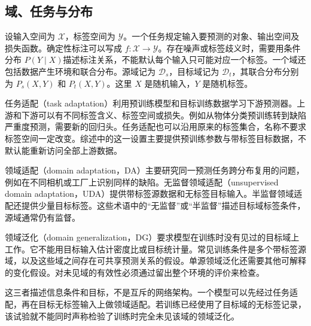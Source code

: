\subsection{域、任务与分布}
设输入空间为 $\mathcal X$，标签空间为 $\mathcal Y$。一个任务规定输入要预测的对象、输出空间及损失函数。确定性标注可以写成 $f:\mathcal X\to\mathcal Y$。存在噪声或标签歧义时，需要用条件分布 $P(Y\mid X)$描述标注关系，不能默认每个输入只可能对应一个标签。一个域还包括数据产生环境和联合分布。源域记为 $\mathcal D_s$，目标域记为 $\mathcal D_t$，其联合分布分别为 $P_s(X,Y)$ 和 $P_t(X,Y)$。这里 $X$ 是随机输入，$Y$ 是随机标签。

任务适配（task adaptation）利用预训练模型和目标训练数据学习下游预测器。上游和下游可以有不同标签含义、标签空间或损失。例如从物体分类预训练转到缺陷严重度预测，需要新的回归头。任务适配也可以沿用原来的标签集合，名称不要求标签空间一定改变。综述中的这一设置主要提供预训练参数与带标签目标数据，不默认能重新访问全部上游数据。

领域适配（domain adaptation，DA）主要研究同一预测任务跨分布复用的问题，例如在不同相机或工厂上识别同样的缺陷。无监督领域适配（unsupervised domain adaptation，UDA）提供带标签源数据和无标签目标输入。半监督领域适配还提供少量目标标签。这些术语中的“无监督”或“半监督”描述目标域标签条件，源域通常仍有监督。

领域泛化（domain generalization，DG）要求模型在训练时没有见过的目标域上工作。它不能用目标输入估计密度比或目标统计量。常见训练条件是多个带标签源域，以及这些域之间存在可共享预测关系的假设。单源领域泛化还需要其他可解释的变化假设。对未见域的有效性必须通过留出整个环境的评价来检查。

这三者描述信息条件和目标，不是互斥的网络架构。一个模型可以先经过任务适配，再在目标无标签输入上做领域适配。若训练已经使用了目标域的无标签记录，该试验就不能同时声称检验了训练时完全未见该域的领域泛化。

